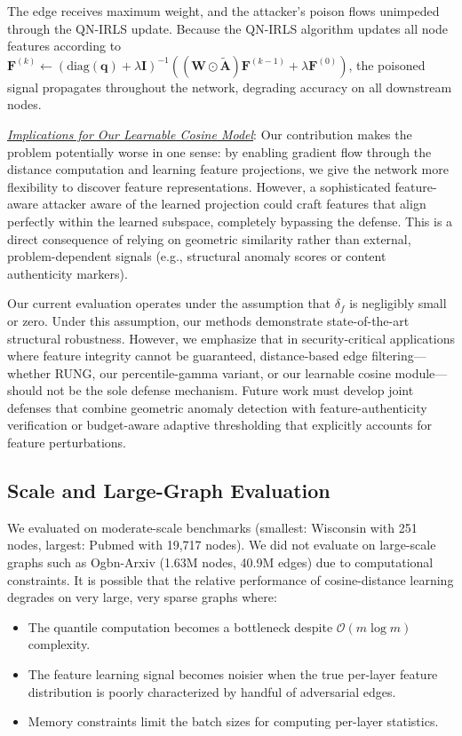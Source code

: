\documentclass[sigconf]{acmart}
\begin{document}
The edge receives maximum weight, and the attacker's poison flows unimpeded through the QN-IRLS update. Because the QN-IRLS algorithm updates all node features according to $\mathbf{F}^{(k)} \gets (\mathrm{diag}(\mathbf{q}) + \lambda\mathbf{I})^{-1}((\mathbf{W} \odot \tilde{\mathbf{A}})\mathbf{F}^{(k-1)} + \lambda\mathbf{F}^{(0)})$, the poisoned signal propagates throughout the network, degrading accuracy on all downstream nodes.

\underline{\textit{Implications for Our Learnable Cosine Model}}: Our contribution makes the problem potentially worse in one sense: by enabling gradient flow through the distance computation and learning feature projections, we give the network more flexibility to discover feature representations. However, a sophisticated feature-aware attacker aware of the learned projection could craft features that align perfectly within the learned subspace, completely bypassing the defense. This is a direct consequence of relying on geometric similarity rather than external, problem-dependent signals (e.g., structural anomaly scores or content authenticity markers).

Our current evaluation operates under the assumption that $\delta_f$ is negligibly small or zero. Under this assumption, our methods demonstrate state-of-the-art structural robustness. However, we emphasize that in security-critical applications where feature integrity cannot be guaranteed, distance-based edge filtering—whether RUNG, our percentile-gamma variant, or our learnable cosine module—should not be the sole defense mechanism. Future work must develop joint defenses that combine geometric anomaly detection with feature-authenticity verification or budget-aware adaptive thresholding that explicitly accounts for feature perturbations.

\subsection{Scale and Large-Graph Evaluation}

We evaluated on moderate-scale benchmarks (smallest: Wisconsin with 251 nodes, largest: Pubmed with 19,717 nodes). We did not evaluate on large-scale graphs such as Ogbn-Arxiv (1.63M nodes, 40.9M edges) due to computational constraints. It is possible that the relative performance of cosine-distance learning degrades on very large, very sparse graphs where:

\begin{itemize}
\item The quantile computation becomes a bottleneck despite $\mathcal{O}(m \log m)$ complexity.
\item The feature learning signal becomes noisier when the true per-layer feature distribution is poorly characterized by handful of adversarial edges.
\item Memory constraints limit the batch sizes for computing per-layer statistics.
\end{itemize}
\end{document}
